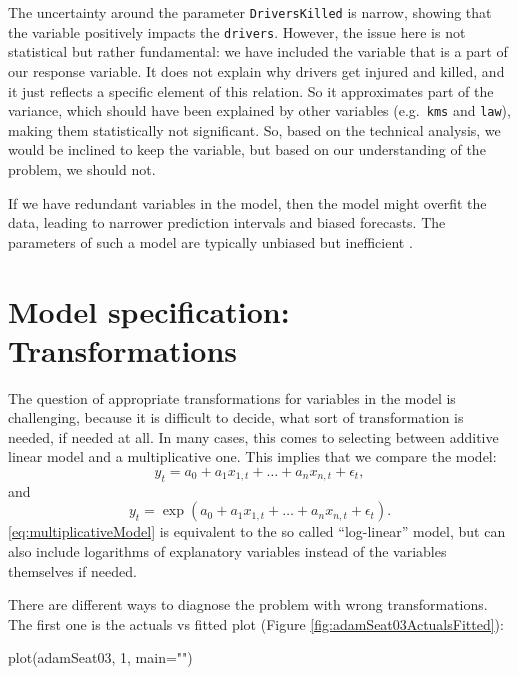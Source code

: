 \documentclass[
]{book}
\newenvironment{Shaded}{\begin{snugshade}}{\end{snugshade}}
\newcommand{\AttributeTok}[1]{\textcolor[rgb]{0.77,0.63,0.00}{#1}}
\newcommand{\DecValTok}[1]{\textcolor[rgb]{0.00,0.00,0.81}{#1}}
\newcommand{\FunctionTok}[1]{\textcolor[rgb]{0.00,0.00,0.00}{#1}}
\newcommand{\NormalTok}[1]{#1}
\newcommand{\StringTok}[1]{\textcolor[rgb]{0.31,0.60,0.02}{#1}}
\theoremstyle{definition}
\theoremstyle{definition}
\theoremstyle{definition}
\theoremstyle{definition}
\theoremstyle{remark}
\begin{document}
The uncertainty around the parameter \texttt{DriversKilled} is narrow, showing that the variable positively impacts the \texttt{drivers}. However, the issue here is not statistical but rather fundamental: we have included the variable that is a part of our response variable. It does not explain why drivers get injured and killed, and it just reflects a specific element of this relation. So it approximates part of the variance, which should have been explained by other variables (e.g.~\texttt{kms} and \texttt{law}), making them statistically not significant. So, based on the technical analysis, we would be inclined to keep the variable, but based on our understanding of the problem, we should not.

If we have redundant variables in the model, then the model might overfit the data, leading to narrower prediction intervals and biased forecasts. The parameters of such a model are typically unbiased but inefficient \citep[Section 4.3 of][]{SvetunkovSBA}.

\hypertarget{diagnosticsTransformations}{%
\section{Model specification: Transformations}\label{diagnosticsTransformations}}

The question of appropriate transformations for variables in the model is challenging, because it is difficult to decide, what sort of transformation is needed, if needed at all. In many cases, this comes to selecting between additive linear model and a multiplicative one. This implies that we compare the model:
\begin{equation}
    y_t = a_0 + a_1 x_{1,t} + \dots + a_n x_{n,t} + \epsilon_t,
    \label{eq:additiveModel}
\end{equation}
and
\begin{equation}
    y_t = \exp\left(a_0 + a_1 x_{1,t} + \dots + a_n x_{n,t} + \epsilon_t\right) .
    \label{eq:multiplicativeModel}
\end{equation}
\eqref{eq:multiplicativeModel} is equivalent to the so called ``log-linear'' model, but can also include logarithms of explanatory variables instead of the variables themselves if needed.

There are different ways to diagnose the problem with wrong transformations. The first one is the actuals vs fitted plot (Figure \ref{fig:adamSeat03ActualsFitted}):

\begin{Shaded}
\begin{Highlighting}[]
\FunctionTok{plot}\NormalTok{(adamSeat03, }\DecValTok{1}\NormalTok{, }\AttributeTok{main=}\StringTok{""}\NormalTok{)}
\end{Highlighting}
\end{Shaded}
\end{document}
